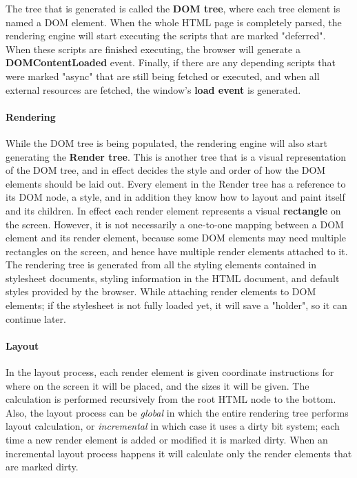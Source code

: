  The tree that is generated is called the \textbf{DOM tree}, where each tree element is named a DOM element. When the whole HTML page is completely parsed, the rendering engine will start executing the scripts that are marked   "deferred". When these scripts are finished executing, the browser will generate a \textbf{DOMContentLoaded} event. Finally, if there are any depending scripts that were marked "async" that are still being fetched or executed, and when all external resources are fetched, the window's \textbf{load event} is generated. 

\paragraph{Rendering}
While the DOM tree is being populated, the rendering engine will also start generating the \textbf{Render tree}. This is another tree that is a visual representation of the DOM tree, and in effect decides the style and order of how the DOM elements should be laid out. Every element in the Render tree has a reference to its DOM node, a style, and in addition they know how to layout and paint itself and its children. In effect each render element represents a visual \textbf{rectangle} on the screen. However, it is not necessarily a one-to-one mapping between a DOM element and its render element, because some DOM elements may need multiple rectangles on the screen, and hence have multiple render elements attached to it. The rendering tree is generated from all the styling elements contained in stylesheet documents, styling information in the HTML document, and default styles provided by the browser. While attaching render elements to DOM elements; if the stylesheet is not fully loaded yet, it will save a  "holder", so it can continue later.

\paragraph{Layout}
In the layout process, each render element is given coordinate instructions for where on the screen it will be placed, and the sizes it will be given. The calculation is performed recursively from the root HTML node to the bottom. Also, the layout process can be \textit{global} in which the entire rendering tree performs layout calculation, or \textit{incremental} in which case it uses a dirty bit system; each time a new render element is added or modified it is marked dirty. When an incremental layout process happens it will calculate only the render elements that are marked dirty.

